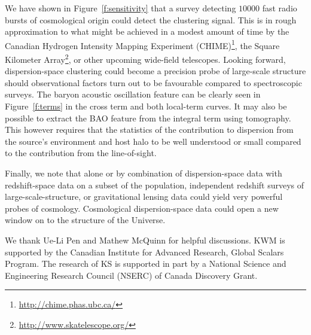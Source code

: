 \documentclass[twocolumn,prl,floatfix]{revtex4-1}
\begin{document}
We have
shown in Figure~\ref{f:sensitivity}
that a survey detecting $10000$ fast radio bursts of cosmological
origin could detect the
clustering signal. This is in rough
approximation to what might be achieved in a modest amount of time by the Canadian Hydrogen Intensity
Mapping Experiment (CHIME)\footnote{\url{http://chime.phas.ubc.ca/}}, the
Square Kilometer Array\footnote{\url{http://www.skatelescope.org/}},
or other upcoming wide-field telescopes.
Looking forward, dispersion-space
clustering could become a precision probe of large-scale structure should
observational factors turn out to be favourable compared to spectroscopic
surveys. The baryon acoustic oscillation feature can be clearly seen in
Figure~\ref{f:terms} in the cross term and both
local-term curves. It may also be possible to extract the BAO feature
from the integral
term using tomography.
This however requires that the statistics of the contribution to dispersion from
the source's environment and host halo to be well understood or small compared to the
contribution from the line-of-sight.  

Finally, we note that alone or by combination of dispersion-space data with redshift-space data on a subset of the population, independent redshift surveys of large-scale-structure, or gravitational lensing data could yield very powerful probes of cosmology.   Cosmological dispersion-space data could open a new window on to the structure of the Universe.


\begin{acknowledgments}

We thank Ue-Li Pen and Mathew McQuinn for helpful discussions.
%
KWM is supported by the Canadian Institute for Advanced Research, Global Scalars
Program.  The research of KS is supported in part by a National Science and Engineering Research Council (NSERC) of Canada Discovery Grant.

\end{acknowledgments}




\end{document}

